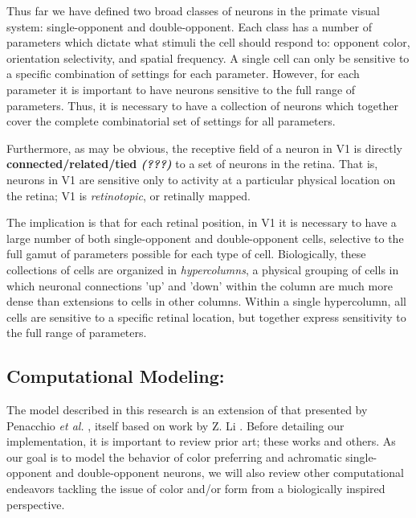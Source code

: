 \documentclass[journal,onecolumn]{IEEEtran}
\begin{document}
Thus far we have defined two broad classes of neurons in the primate visual system: single-opponent and double-opponent. Each class has a number of parameters which dictate what stimuli the cell should respond to: opponent color, orientation selectivity, and spatial frequency. A single cell can only be sensitive to a specific combination of settings for each parameter. However, for each parameter it is important to have neurons sensitive to the full range of parameters. Thus, it is necessary to have a collection of neurons which together cover the complete combinatorial set of settings for all parameters.

Furthermore, as may be obvious, the receptive field of a neuron in V1 is directly \textbf{connected/related/tied \textit{(???)}} to a set of neurons in the retina. That is, neurons in V1 are sensitive only to activity at a particular physical location on the retina; V1 is \textit{retinotopic}, or retinally mapped.

The implication is that for each retinal position, in V1 it is necessary to have a large number of both single-opponent and double-opponent cells, selective to the full gamut of parameters possible for each type of cell. Biologically, these collections of cells are organized in \textit{hypercolumns}, a physical grouping of cells in which neuronal connections 'up' and 'down' within the column are much more dense than extensions to cells in other columns. Within a single hypercolumn, all cells are sensitive to a specific retinal location, but together express sensitivity to the full range of parameters.


\subsection{Computational Modeling:}

The model described in this research is an extension of that presented by Penacchio \textit{et al.} \cite{penacchio:2013}, itself based on work by Z. Li \cite{li:1998, li:1999}. Before detailing our implementation, it is important to review prior art; these works and others. As our goal is to model the behavior of color preferring and achromatic single-opponent and double-opponent neurons, we will also review other computational endeavors tackling the issue of color and/or form from a biologically inspired perspective.
\end{document}

